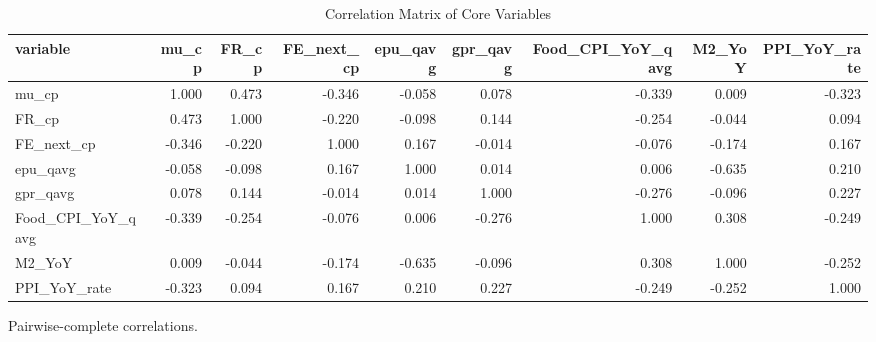\begin{table}[!htbp]
\centering
\caption{Correlation Matrix of Core Variables}
\label{tab:correlation_matrix}
\begin{threeparttable}

\begin{tabular}{lrrrrrrrr}
\toprule
variable & mu\_cp & FR\_cp & FE\_next\_cp & epu\_qavg & gpr\_qavg & Food\_CPI\_YoY\_qavg & M2\_YoY & PPI\_YoY\_rate\\
\midrule
mu\_cp & 1.000 & 0.473 & -0.346 & -0.058 & 0.078 & -0.339 & 0.009 & -0.323\\
FR\_cp & 0.473 & 1.000 & -0.220 & -0.098 & 0.144 & -0.254 & -0.044 & 0.094\\
FE\_next\_cp & -0.346 & -0.220 & 1.000 & 0.167 & -0.014 & -0.076 & -0.174 & 0.167\\
epu\_qavg & -0.058 & -0.098 & 0.167 & 1.000 & 0.014 & 0.006 & -0.635 & 0.210\\
gpr\_qavg & 0.078 & 0.144 & -0.014 & 0.014 & 1.000 & -0.276 & -0.096 & 0.227\\
\addlinespace
Food\_CPI\_YoY\_qavg & -0.339 & -0.254 & -0.076 & 0.006 & -0.276 & 1.000 & 0.308 & -0.249\\
M2\_YoY & 0.009 & -0.044 & -0.174 & -0.635 & -0.096 & 0.308 & 1.000 & -0.252\\
PPI\_YoY\_rate & -0.323 & 0.094 & 0.167 & 0.210 & 0.227 & -0.249 & -0.252 & 1.000\\
\bottomrule
\end{tabular}
\begin{tablenotes}[flushleft]
\footnotesize
\item Pairwise-complete correlations.
\end{tablenotes}
\end{threeparttable}
\end{table}
